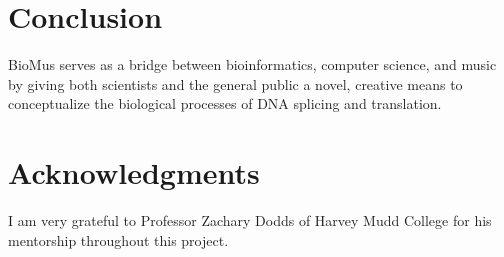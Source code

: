 \documentclass[letterpaper]{article}
\begin{document}
\section{Conclusion}
BioMus serves as a bridge between bioinformatics, computer science, and music by giving both scientists and the general public a novel, creative means to conceptualize the biological processes of DNA splicing and translation.


\section{Acknowledgments}

I am very grateful to Professor Zachary Dodds of Harvey Mudd College for his mentorship throughout this project.




\end{document}
